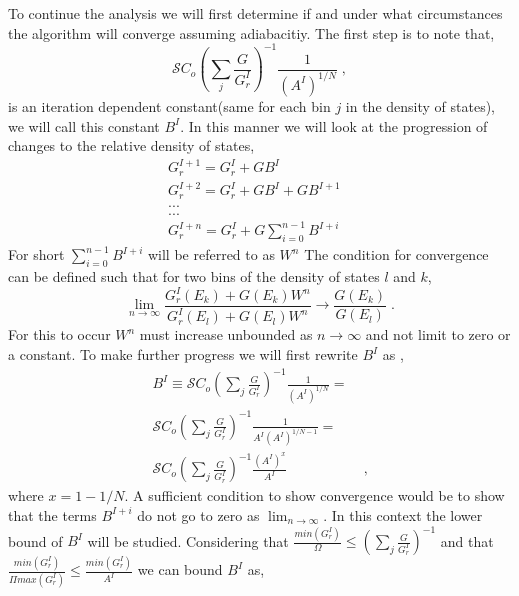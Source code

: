 \documentclass[aps,pre,reprint,superscriptaddress,showkeys]{revtex4-2}
\begin{document}
To continue the analysis we will first determine if and under what circumstances the algorithm will converge assuming adiabacitiy. The first step is to note that, 
\begin{equation}
\mathcal{S}{C_o}(\sum_{j}\frac{G}{G_r^I})^{-1}\frac{1}{(A^I)^{1/N}} \;,
\end{equation}
is an iteration dependent constant(same  for each bin $j$ in the density of states), we will call this constant $B^I$. In this manner we will look at the progression of changes to the relative density of states, 
\begin{equation}
\begin{split}
G_r^{I+1} = G_r^{I} + GB^I\\
G_r^{I+2} = G_r^{I} + GB^I + GB^{I+1} &\\
...&\\
...&\\
G_r^{I+n} = G_r^{I} + G\sum_{i=0}^{n-1}  B^{I+i} &
\end{split}
\label{Gr_IplusN}
\end{equation}
For short $\sum_{i=0}^{n-1}  B^{I+i}$ will be referred to as $W^n$
The condition for convergence can be defined such that for two bins of the density of states $l$ and $k$, 
\begin{equation}
\lim_{n\rightarrow \infty} \frac{G_r^{I}(E_k) + G(E_k)W^n}{G_r^{I}(E_l) + G(E_l)W^n} \rightarrow \frac{G(E_k)}{G(E_l)}\;.
\end{equation}
For this to occur $W^n$ must increase unbounded as $n\rightarrow \infty$ and not limit to zero or a constant. To make further progress we will first rewrite $B^I$ as , 
\begin{equation}
\begin{split}
B^I\equiv \mathcal{S}{C_o}(\sum_{j}\frac{G}{G_r^{I}})^{-1}\frac{1}{(A^I)^{1/N}} = \\
\mathcal{S}{C_o}(\sum_{j}\frac{G}{G_r^{I}})^{-1}\frac{1}{A^I(A^I)^{1/N - 1}} = & \\
\mathcal{S}{C_o}(\sum_{j}\frac{G}{G_r^{I}})^{-1}\frac{(A^I)^{x}}{A^I} & \;,
\end{split}
\end{equation}
where $x = 1 - 1/N$. A sufficient condition to show convergence would be to show that the terms $B^{I+i}$ do not go to zero as $\lim_{n \rightarrow \infty}$. In this context the lower bound of $B^I$ will be studied. Considering that $ \frac{min(G_r^{I})}{\Omega} \le (\sum_{j}\frac{G}{G_r^{I}})^{-1}$ and that $\frac{min(G_r^{I})}{\Pi max(G_r^{I})} \le \frac{min(G_r^{I})}{A^I}$ we can bound $B^I$ as, 
\end{document}
